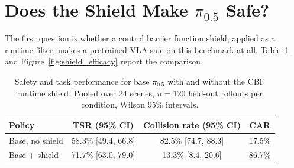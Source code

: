 %
%
%
%

\section{Does the Shield Make \texorpdfstring{$\pi_{0.5}$}{pi 0.5} Safe?}\label{sec:shield_efficacy}

The first question is whether a control barrier function shield, applied as a runtime filter, makes
a pretrained VLA safe on this benchmark at all. Table~\ref{tab:shield_efficacy} and
Figure~\ref{fig:shield_efficacy} report the comparison.

\begin{table}[htbp]
\centering
\caption{Safety and task performance for base $\pi_{0.5}$ with and without the CBF runtime shield.
  Pooled over 24 scenes, $n = 120$ held-out rollouts per condition, Wilson 95\% intervals.}
\label{tab:shield_efficacy}
\begin{tabular}{lccc}
\toprule
\textbf{Policy} & \textbf{TSR (95\% CI)} & \textbf{Collision rate (95\% CI)} & \textbf{CAR} \\
\midrule
Base, no shield & 58.3\% [49.4, 66.8] & 82.5\% [74.7, 88.3] & 17.5\% \\
Base + shield   & 71.7\% [63.0, 79.0] & 13.3\% [\phantom{0}8.4, 20.6] & 86.7\% \\
\bottomrule
\end{tabular}
\end{table}

